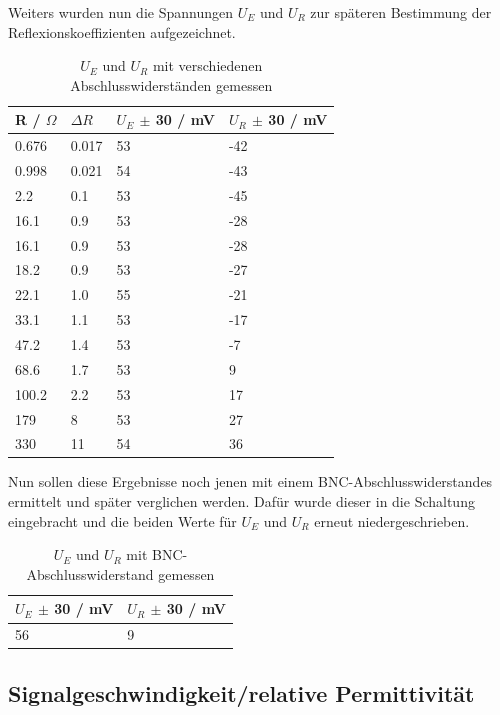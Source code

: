 \documentclass[12pt,a4paper,twoside]{article}
\begin{document}
\noindent
Weiters wurden nun die Spannungen $U_E$ und $U_R$ zur späteren Bestimmung der Reflexionskoeffizienten aufgezeichnet.

\begin{table}[H]
    \centering
    \caption{$U_E$ und $U_R$ mit verschiedenen Abschlusswiderständen gemessen}
    \label{tab:A2Spannungen}
    \begin{tabular}{| l | l | l | l |}
        \hline
        R / $\Omega$ & $\Delta R$ & $U_E$ $\pm$ 30 / mV & $U_R$ $\pm$ 30 / mV \\
        \hline
       0.676 & 0.017 & 53 & -42 \\
       0.998 & 0.021 & 54 & -43 \\
         2.2 & 0.1   & 53 & -45 \\
        16.1 & 0.9   & 53 & -28 \\
        16.1 & 0.9   & 53 & -28 \\
        18.2 & 0.9   & 53 & -27 \\
        22.1 & 1.0   & 55 & -21 \\
        33.1 & 1.1   & 53 & -17 \\
        47.2 & 1.4   & 53 &  -7 \\
        68.6 & 1.7   & 53 &   9 \\
       100.2 & 2.2   & 53 &  17 \\
         179 & 8     & 53 &  27 \\
         330 & 11    & 54 &  36 \\
        \hline
    \end{tabular}
\end{table}

\noindent
Nun sollen diese Ergebnisse noch jenen mit einem BNC-Abschlusswiderstandes ermittelt und später verglichen werden.
Dafür wurde dieser in die Schaltung eingebracht und die beiden Werte für $U_E$ und $U_R$ erneut niedergeschrieben.

\begin{table}[H]
    \centering
    \caption{$U_E$ und $U_R$ mit BNC-Abschlusswiderstand gemessen}
    \label{tab:A2SpannungenBNC}
    \begin{tabular}{| l | l |}
        \hline
        $U_E$ $\pm$ 30 / mV & $U_R$ $\pm$ 30 / mV \\
        \hline
        56 & 9 \\
        \hline
    \end{tabular}
\end{table}


\subsection{Signalgeschwindigkeit/relative Permittivität}
\end{document}
